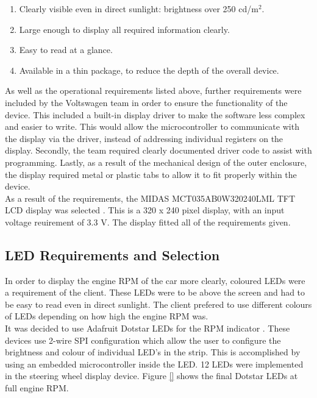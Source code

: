 \documentclass[a4paper,12pt]{article}
\begin{document}
\begin{enumerate}
  \item Clearly visible even in direct sunlight: brightness over 250 cd/$\textrm{m}^2$.
  \item Large enough to display all required information clearly.
  \item Easy to read at a glance.
  \item Available in a thin package, to reduce the depth of the overall device.
\end{enumerate}

As well as the operational requirements listed above, further requirements were included by the Voltswagen team in order to ensure the functionality of the device. This included a built-in display driver to make the software less complex and easier to write. This would allow the microcontroller to communicate with the display via the driver, instead of addressing individual registers on the display. Secondly, the team required clearly documented driver code to assist with programming. Lastly, as a result of the mechanical design of the outer enclosure, the display required metal or plastic tabs to allow it to fit properly within the device. \\

As a result of the requirements, the MIDAS MCT035AB0W320240LML TFT LCD display was selected \cite{display_datasheet}. This is a 320 x 240 pixel display, with an input voltage reuirement of 3.3 V. The display fitted all of the requirements given.

\subsection{LED Requirements and Selection}
\label{sec:LEDs}

In order to display the engine RPM of the car more clearly, coloured LEDs were a requirement of the client. These LEDs were to be above the screen and had to be easy to read even in direct sunlight. The client prefered to use different colours of LEDs depending on how high the engine RPM was. \\

It was decided to use Adafruit Dotstar LEDs for the RPM indicator \cite{dotstar_datasheet}. These devices use 2-wire SPI configuration which allow the user to configure the brightness and colour of individual LED’s in the strip. This is accomplished by using an embedded microcontroller inside the LED. 12 LEDs were implemented in the steering wheel display device. Figure \ref{} shows the final Dotstar LEDs at full engine RPM. \\
\end{document}
